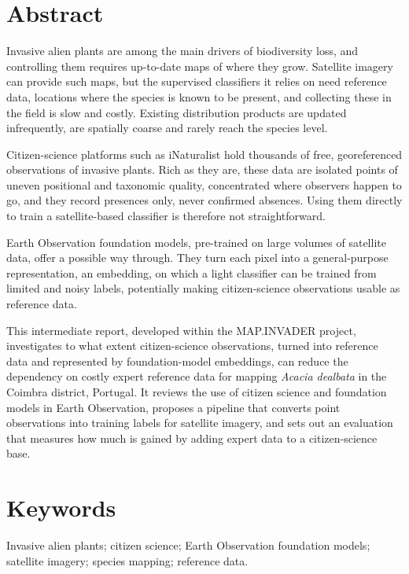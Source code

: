 \thispagestyle{plain}

\section*{Abstract}
\label{sec:abstract}

Invasive alien plants are among the main drivers of biodiversity loss,
and controlling them requires up-to-date maps of where they grow.
Satellite imagery can provide such maps, but the supervised classifiers
it relies on need reference data, locations where the species is known
to be present, and collecting these in the field is slow and costly.
Existing distribution products are updated infrequently, are spatially
coarse and rarely reach the species level.

Citizen-science platforms such as iNaturalist hold thousands of free,
georeferenced observations of invasive plants. Rich as they are, these
data are isolated points of uneven positional and taxonomic quality,
concentrated where observers happen to go, and they record presences
only, never confirmed absences. Using them directly to train a
satellite-based classifier is therefore not straightforward.

Earth Observation foundation models, pre-trained on large volumes of
satellite data, offer a possible way through. They turn each pixel into
a general-purpose representation, an embedding, on which a light
classifier can be trained from limited and noisy labels, potentially
making citizen-science observations usable as reference data.

This intermediate report, developed within the MAP.INVADER project,
investigates to what extent citizen-science observations, turned into
reference data and represented by foundation-model embeddings, can
reduce the dependency on costly expert reference data for mapping
\emph{Acacia dealbata} in the Coimbra district, Portugal. It reviews
the use of citizen science and foundation models in Earth Observation,
proposes a pipeline that converts point observations into training
labels for satellite imagery, and sets out an evaluation that measures
how much is gained by adding expert data to a citizen-science base.

\section*{Keywords}
\label{sec:keywords}

Invasive alien plants; citizen science; Earth Observation foundation
models; satellite imagery; species mapping; reference data.
